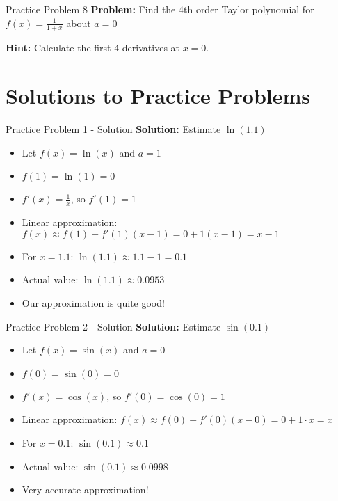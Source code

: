 \documentclass[aspectratio=169]{beamer}
\begin{document}
\begin{frame}{Practice Problem 8}
\textbf{Problem:} Find the 4th order Taylor polynomial for $f(x) = \frac{1}{1+x}$ about $a = 0$

\textbf{Hint:} Calculate the first 4 derivatives at $x = 0$.
\end{frame}

\section{Solutions to Practice Problems}

\begin{frame}{Practice Problem 1 - Solution}
\textbf{Solution:} Estimate $\ln(1.1)$

\begin{itemize}
    \item Let $f(x) = \ln(x)$ and $a = 1$
    \item $f(1) = \ln(1) = 0$
    \item $f'(x) = \frac{1}{x}$, so $f'(1) = 1$
    \item Linear approximation: $f(x) \approx f(1) + f'(1)(x-1) = 0 + 1(x-1) = x-1$
    \item For $x = 1.1$: $\ln(1.1) \approx 1.1 - 1 = 0.1$
    \item Actual value: $\ln(1.1) \approx 0.0953$
    \item Our approximation is quite good!
\end{itemize}
\end{frame}

\begin{frame}{Practice Problem 2 - Solution}
\textbf{Solution:} Estimate $\sin(0.1)$

\begin{itemize}
    \item Let $f(x) = \sin(x)$ and $a = 0$
    \item $f(0) = \sin(0) = 0$
    \item $f'(x) = \cos(x)$, so $f'(0) = \cos(0) = 1$
    \item Linear approximation: $f(x) \approx f(0) + f'(0)(x-0) = 0 + 1 \cdot x = x$
    \item For $x = 0.1$: $\sin(0.1) \approx 0.1$
    \item Actual value: $\sin(0.1) \approx 0.0998$
    \item Very accurate approximation!
\end{itemize}
\end{frame}
\end{document}
